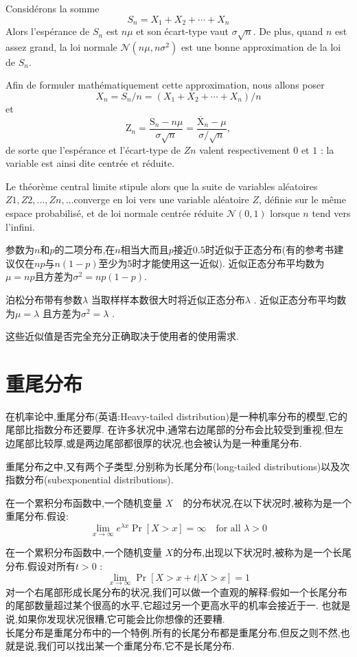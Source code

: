 \documentclass{article}
\begin{document}
Consid\'erons la somme
$$S_n = X_1 + X_2 + \cdots + X_n$$
Alors l'esp\'erance de $S_n$ est $n\mu$ et
son \'ecart-type vaut $\sigma \sqrt{n}$.
De plus, quand $n$ est assez grand, la loi normale $\mathcal{N}(n \mu,n \sigma^2)$ est une bonne approximation de la loi de $S_n$.

Afin de formuler math\'ematiquement cette approximation, nous allons poser
$$ X_n = S_n/n = (X_1 + X_2 + \cdots + X_n)/n $$
et
$$ \mathrm{Z}_n = \frac{\mathrm{S}_n - n \mu}{\sigma \sqrt{n}} = \frac{\overline{\mathrm{X}}_n - \mu}{\sigma/\sqrt{n}}, $$
de sorte que l'esp\'erance et l'\'ecart-type de $Zn$ valent respectivement $0$ et $1$ : la variable est ainsi dite centr\'ee et r\'eduite.

Le th\'eor\`eme central limite stipule alors que la suite de variables al\'eatoires $Z1, Z2,..., Zn,... $converge en loi vers une variable al\'eatoire $Z$,
d\'efinie sur le m\^eme espace probabilis\'e, et de loi normale centr\'ee r\'eduite $\mathcal{N} (0, 1)$ lorsque $n$ tend vers l'infini.

参数为$n$和$p$的二项分布,在$n$相当大而且$p$接近$0.5$时近似于正态分布(有的参考书建议仅在$np$与$n(1-p)$至少为5时才能使用这一近似).
近似正态分布平均数为$\mu =np$且方差为$\sigma ^{2}=np(1-p)$.

泊松分布带有参数$\lambda$ 当取样样本数很大时将近似正态分布$\lambda$ .
近似正态分布平均数为$\mu =\lambda$ 且方差为$\sigma ^{2}=\lambda$ .

这些近似值是否完全充分正确取决于使用者的使用需求.

\section{重尾分布}
在机率论中,重尾分布(英语:Heavy-tailed distribution)是一种机率分布的模型,它的尾部比指数分布还要厚.
在许多状况中,通常右边尾部的分布会比较受到重视,但左边尾部比较厚,或是两边尾部都很厚的状况,也会被认为是一种重尾分布.

重尾分布之中,又有两个子类型,分别称为长尾分布(long-tailed distributions)以及次指数分布(subexponential distributions).

在一个累积分布函数中,一个随机变量 $X$　的分布状况,在以下状况时,被称为是一个重尾分布.假设:
$$ \lim_{x \to \infty} e^{\lambda x}\Pr[X>x] = \infty \quad \mbox{for all } \lambda>0 $$

在一个累积分布函数中,一个随机变量 $X$的分布,出现以下状况时,被称为是一个长尾分布.假设对所有$t > 0$ :
$$ \lim_{x \to \infty} \Pr[X>x+t|X>x] =1$$
对一个右尾部形成长尾分布的状况,我们可以做一个直观的解释:假如一个长尾分布的尾部数量超过某个很高的水平,它超过另一个更高水平的机率会接近于一.
也就是说,如果你发现状况很糟,它可能会比你想像的还要糟.\\
长尾分布是重尾分布中的一个特例.所有的长尾分布都是重尾分布,但反之则不然,也就是说,我们可以找出某一个重尾分布,它不是长尾分布.
\end{document}
